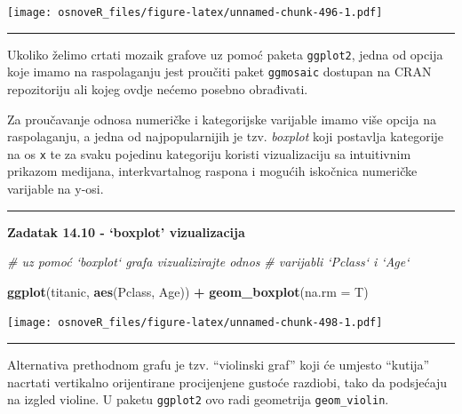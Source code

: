 \documentclass[]{book}
\newenvironment{Shaded}{\begin{snugshade}}{\end{snugshade}}
\newcommand{\KeywordTok}[1]{\textcolor[rgb]{0.13,0.29,0.53}{\textbf{#1}}}
\newcommand{\DataTypeTok}[1]{\textcolor[rgb]{0.13,0.29,0.53}{#1}}
\newcommand{\StringTok}[1]{\textcolor[rgb]{0.31,0.60,0.02}{#1}}
\newcommand{\CommentTok}[1]{\textcolor[rgb]{0.56,0.35,0.01}{\textit{#1}}}
\newcommand{\OperatorTok}[1]{\textcolor[rgb]{0.81,0.36,0.00}{\textbf{#1}}}
\newcommand{\NormalTok}[1]{#1}
\theoremstyle{definition}
\theoremstyle{definition}
\theoremstyle{definition}
\theoremstyle{remark}
\begin{document}
\texttt{[image: osnoveR\_files/figure-latex/unnamed-chunk-496-1.pdf]}

\begin{center}\rule{0.5\linewidth}{\linethickness}\end{center}

Ukoliko želimo crtati mozaik grafove uz pomoć paketa \texttt{ggplot2},
jedna od opcija koje imamo na raspolaganju jest proučiti paket
\texttt{ggmosaic} dostupan na CRAN repozitoriju ali kojeg ovdje nećemo
posebno obrađivati.

Za proučavanje odnosa numeričke i kategorijske varijable imamo više
opcija na raspolaganju, a jedna od najpopularnijih je tzv.
\emph{boxplot} koji postavlja kategorije na os \texttt{x} te za svaku
pojedinu kategoriju koristi vizualizaciju sa intuitivnim prikazom
medijana, interkvartalnog raspona i mogućih iskočnica numeričke
varijable na y-osi.

\begin{center}\rule{0.5\linewidth}{\linethickness}\end{center}

\textbf{Zadatak 14.10 - `boxplot' vizualizacija}

\begin{Shaded}
\begin{Highlighting}[]
\CommentTok{# uz pomoć `boxplot` grafa vizualizirajte odnos}
\CommentTok{#  varijabli `Pclass` i `Age`}
\end{Highlighting}
\end{Shaded}

\begin{Shaded}
\begin{Highlighting}[]
\KeywordTok{ggplot}\NormalTok{(titanic, }\KeywordTok{aes}\NormalTok{(Pclass, Age)) }\OperatorTok{+}\StringTok{ }\KeywordTok{geom_boxplot}\NormalTok{(}\DataTypeTok{na.rm =}\NormalTok{ T)}
\end{Highlighting}
\end{Shaded}

\texttt{[image: osnoveR\_files/figure-latex/unnamed-chunk-498-1.pdf]}

\begin{center}\rule{0.5\linewidth}{\linethickness}\end{center}

Alternativa prethodnom grafu je tzv. ``violinski graf'' koji će umjesto
``kutija'' nacrtati vertikalno orijentirane procijenjene gustoće
razdiobi, tako da podsjećaju na izgled violine. U paketu
\texttt{ggplot2} ovo radi geometrija \texttt{geom\_violin}.
\end{document}
